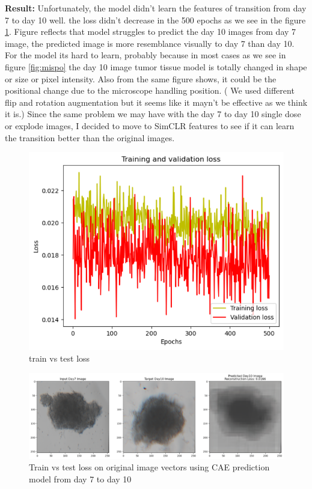 \textbf{Result:}
Unfortunately, the model didn't learn the features of transition from day 7 to day 10 well. the loss didn't decrease in the 500 epochs as we see in the figure \ref{fig:uloss}.  Figure reflects that
model struggles to predict the day 10 images from day 7 image, the predicted image is more resemblance visually to day 7 than day 10. For the model its hard to learn, probably because in most cases as we see in figure \ref{fig:mispo} the day 10 image tumor tissue model is totally changed in 
shape or size or  pixel intensity. Also from the same figure shows, it could be the positional change due to the microscope handling position. ( We used different flip and rotation 
augmentation but it seems like it mayn't be effective as we think it is.) Since the same problem we may have with the day 7 to day 10 single dose or explode images, I decided to move to
SimCLR features to see if it can learn the transition better than the original images. 
\begin{figure}[H]
  \centering
  \includegraphics[scale=0.46]{figures/rankloss.png} 
  \caption{train vs test loss}
  \label{fig:uloss}
\end{figure}

\begin{figure}[H]
  \centering
  \includegraphics[scale=0.46]{figures/unpred.png} 
  \caption{Train vs test loss on original image vectors using CAE prediction model from day 7 to day 10}
  \label{fig:unloss}
\end{figure}

